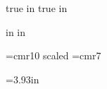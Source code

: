 %
%

\sloppy

\newif\iflong %
\longfalse
\def\piflong#1{\iflong#1
\else\fi}%
\long\def\lpiflong#1{\iflong#1
\else\fi}%

\def\xpair{{x_1,x_2}}

 true in
 true in
\nopagenumbers

\def\compressedDisplay#1{\vskip -8pt\relax$$#1$$}

 in
 in
\hsize=8in
\vsize=10.5in
\parindent=0pt

\font\bigger =cmr10 scaled
\font\smallfont=cmr7


\def\strutA#1#2{\vrule height#1 depth#2 width0pt}

=3.93in
\newbox\bigbox

